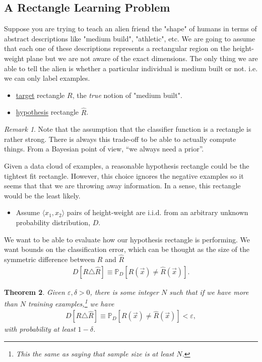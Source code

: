 \documentclass[12pt, letterpaper]{article}
\numberwithin{equation}{section} %
\newcommand{\ul}{\underline}
\newcommand{\mb}{\mathbb}
\newcommand{\ve}{\varepsilon}
\newtheorem{theorem}{Theorem}[section]
\theoremstyle{definition}
\theoremstyle{remark}
\newtheorem{remark}[theorem]{Remark}
\begin{document}
\subsection{A Rectangle Learning Problem}

Suppose you are trying to teach an alien friend the "shape" of humans in terms of abstract descriptions like "medium build", "athletic", etc. 
We are going to assume that each one of these descriptions represents a rectangular region on the height-weight plane but we are not aware of the exact dimensions. 
The only thing we are able to tell the alien is whether a particular individual is medium built or not. i.e. we can only label examples.

\begin{itemize}
	\item \ul{target} rectangle $R$, the \emph{true} notion of "medium built".
	\item \ul{hypothesis} rectangle $\hat R$. 
\end{itemize}

\begin{remark}
	Note that the assumption that the classifier function is a rectangle is rather strong. 
	There is always this trade-off to be able to actually compute things. 
	From a Bayesian point of view, ``we always need a prior''.
\end{remark}

Given a data cloud of examples, a reasonable hypothesis rectangle could be the tightest fit rectangle. 
However, this choice ignores the negative examples so it seems that that we are throwing away information. 
In a sense, this rectangle would be the least likely.

\begin{itemize}
	\item Assume $\langle x_1,x_2 \rangle$ pairs of height-weight are i.i.d. from an arbitrary unknown probability distribution, $D$.
\end{itemize}

We want to be able to evaluate how our hypothesis rectangle is performing. 
We want bounds on the classification error, which can be thought as the size of the symmetric difference between $R$ and $\hat R$
\begin{align}
	D[R\triangle \hat R] \equiv \mb P_D[R(\vec x) \ne \hat R(\vec x)].
\end{align}

\begin{theorem}
	Given $\ve,\delta >0$, there is some integer $N$ such that if we have more than $N$ training examples,\footnote{This the same as saying that sample size is at least $N$.} we have
	\begin{align}
		D[R\triangle \hat R] \equiv \mb P_D[R(\vec x) \ne \hat R(\vec x)] < \ve,
	\end{align}
	with probability at least $1-\delta$.
\end{theorem}
\end{document}
